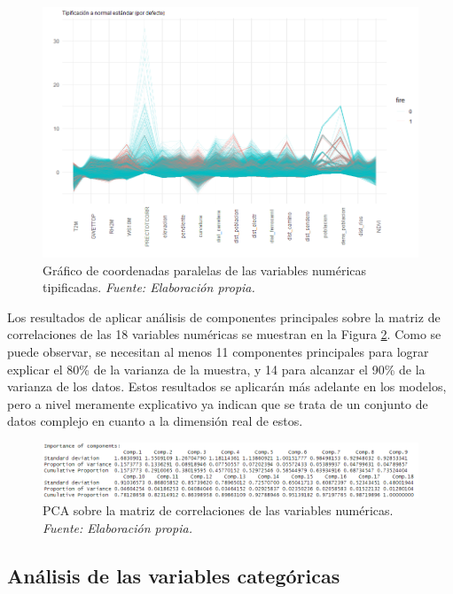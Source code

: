 \documentclass[12pt,a4paper,]{book}
\numberwithin{dummy}{section}
\theoremstyle{ocrenumbox}
\theoremstyle{blacknumex}
\theoremstyle{blacknumbox}
\theoremstyle{ocrenum}
\theoremstyle{ocrenum}
\begin{document}
\begin{figure}[h]
\centering
\includegraphics[width =\textwidth]{graficos/parcoord.png}
\caption{Gráfico de coordenadas paralelas de las variables numéricas tipificadas. \it Fuente: Elaboración propia.}
\label{fig:parcoord}
\end{figure}

Los resultados de aplicar análisis de componentes principales sobre la
matriz de correlaciones de las 18 variables numéricas se muestran en la
Figura \ref{fig:PCA}. Como se puede observar, se necesitan al menos 11
componentes principales para lograr explicar el 80\% de la varianza de
la muestra, y 14 para alcanzar el 90\% de la varianza de los datos.
Estos resultados se aplicarán más adelante en los modelos, pero a nivel
meramente explicativo ya indican que se trata de un conjunto de datos
complejo en cuanto a la dimensión real de estos.

\begin{figure}[h]
\centering
\includegraphics[width =\textwidth]{graficos/pca.png}
\caption{PCA sobre la matriz de correlaciones de las variables numéricas. \it Fuente: Elaboración propia.}
\label{fig:PCA}
\end{figure}

\hypertarget{anuxe1lisis-de-las-variables-categuxf3ricas}{%
\subsection{Análisis de las variables
categóricas}\label{anuxe1lisis-de-las-variables-categuxf3ricas}}
\end{document}
